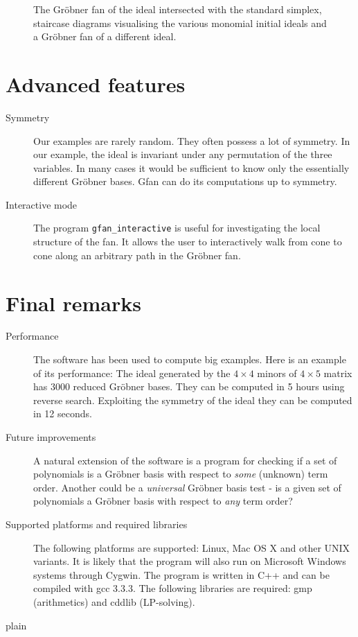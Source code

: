 \documentclass[11pt]{article}
\def\name{Gfan }
\begin{document}
\begin{description}
\begin{figure}
\begin{center}
\end{center}
\caption{The Gr\"obner fan of the ideal intersected with the standard simplex, staircase diagrams visualising the various monomial initial ideals and a Gr\"obner fan of a different ideal.}
\label{fig:fan}
\end{figure}

\end{description}
\section{Advanced features}
\begin{description}
\item[Symmetry] Our examples are rarely random. They often possess a lot of symmetry. In our example, the ideal is invariant under any permutation of the three variables. In many cases it would be sufficient to know only the essentially different Gr\"obner bases. \name can do its computations up to symmetry.
\item[Interactive mode] The program {\tt gfan\_interactive} is useful for investigating the local structure of the fan. It allows the user to interactively walk from cone to cone along an arbitrary path in the Gr\"obner fan.
\end{description}
\section{Final remarks}
\begin{description}
\item[Performance] The software has been used to compute big examples. Here is an example of its performance: The ideal generated by the $4\times 4$ minors of $4\times 5$ matrix has 3000 reduced Gr\"obner bases. They can be computed in 5 hours using reverse search. Exploiting the symmetry of the ideal they can be computed in 12 seconds.
\item[Future improvements] A natural extension of the software is a program for checking if a set of polynomials is a Gr\"obner basis with respect to \emph{some} (unknown) term order. Another could be a \emph{universal} Gr\"obner basis test - is a given set of polynomials a Gr\"obner basis with respect to \emph{any} term order?
\item[Supported platforms and required libraries] The following platforms are supported: Linux, Mac OS X and other UNIX variants. It is likely that the program will also run on Microsoft Windows systems through Cygwin. The program is written in C++ and can be compiled with gcc 3.3.3. The following libraries are required: gmp \cite{gmp} (arithmetics) and cddlib \cite{cdd} (LP-solving).
\end{description}

 {plain}

 
\end{document}
